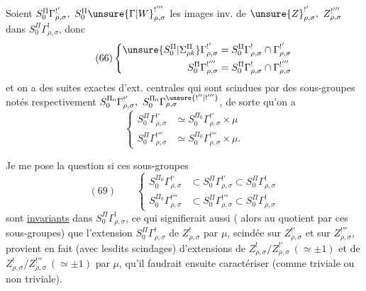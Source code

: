 Soient $S_0^\Pi\Gamma^{!'}_{\rho,\sigma},\ S_0^\Pi\unsure{\Gamma|W}^{!'''}_{\rho,\sigma}$\unsure{)|]}
les images inv. de $\unsure{Z}^{!'}_{\rho,\sigma},\ Z^{!'''}_{\rho,\sigma}$
dans $S_0^\Pi\Gamma^!_{\rho,\sigma}$, donc
\[
\tag{66}
\left\{
\begin{aligned}
\unsure{S_0^\Pi|\Sigma_{\rho k}^{\Pi}}\Gamma^{!'}_{\rho,\sigma}
&=S_0^\Pi\Gamma^!_{\rho,\sigma}\cap\Gamma^{!'}_{\rho,\sigma}\\
S_0^\Pi\Gamma^{!'''}_{\rho,\sigma}
&=S_0^\Pi\Gamma^!_{\rho,\sigma}\cap\Gamma^{!'''}_{\rho,\sigma}
\end{aligned}
\right.
\]
et on a des suites exactes d'ext. centrales
qui sont scindues par des sous-groupes notés respectivement
$S_0^{\Pi_0}\Gamma^{!'}_{\rho,\sigma},\ S_0^{\Pi_0}\Gamma^{\unsure{!''|!'''}}_{\rho,\sigma}$,
de sorte qu'on a
\[
\tag{68}
\left\{
\begin{aligned}
S_0^\Pi\Gamma^{!'}_{\rho,\sigma}
&\simeq S_0^{\Pi_0}\Gamma^{!'}_{\rho,\sigma}\times\mu\\
S_0^\Pi\Gamma^{!'''}_{\rho,\sigma}
&\simeq S_0^{\Pi_0}\Gamma^{!'''}_{\rho,\sigma}\times\mu.
\end{aligned}
\right.
\]


Je me pose la question si ces sous-groupes
\[
(69)\qquad
\left\{
\begin{aligned}
S_0^{\Pi_0}\Gamma_{\rho,\sigma}^{!'}&\subset S_0^{\Pi}\Gamma_{\rho,\sigma}^{!'}\subset S_0^{\Pi}\Gamma_{\rho,\sigma}^{!}\\
S_0^{\Pi_0}\Gamma_{\rho,\sigma}^{!'''}&\subset S_0^{\Pi}\Gamma_{\rho,\sigma}^{!'''}\subset S_0^{\Pi}\Gamma_{\rho,\sigma}^{!}
\end{aligned}
\right.
\]
sont \uline{invariants} dans $S_0^{\Pi}\Gamma_{\rho,\sigma}^{!}$, ce qui
signifierait aussi ( alors au quotient par ces sous-groupes)
que l'extension $S_0^{\Pi}\Gamma_{\rho,\sigma}^{!}$ de $Z_{\rho,\sigma}^{!}$
par $\mu$, scindée sur $Z_{\rho,\sigma}^{!'}$ et sur $Z_{\rho,\sigma}^{!'''}$,
provient en fait (avec lesdits scindages) d'extensions de
$Z_{\rho,\sigma}^{!}/Z_{\rho,\sigma}^{!'}\ (\simeq\pm1)$ et de
$Z_{\rho,\sigma}^{!}/Z_{\rho,\sigma}^{!'''}\ (\simeq\pm1)$ par $\mu$,
qu'il faudrait ensuite caractériser (comme triviale ou non triviale).

